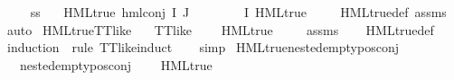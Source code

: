 \begin{isabellebody}
\isanewline
{}\isamarkupfalse%
\ \isanewline
\ \ \ s{\isacharcolon}{\kern0pt}{\isacharcolon}{\kern0pt}{\isacharprime}{\kern0pt}s\isanewline
\ \ \ {\isachardoublequoteopen}HML{\isacharunderscore}{\kern0pt}true\ {\isacharparenleft}{\kern0pt}hml{\isacharunderscore}{\kern0pt}conj\ I\ J\ {\isasymPhi}{\isacharparenright}{\kern0pt}{\isachardoublequoteclose}\isanewline
\ \ \ {\isachardoublequoteopen}{\isasymforall}{\isasymphi}\ {\isasymin}\ {\isasymPhi}\ {\isacharbackquote}{\kern0pt}\ I{\isachardot}{\kern0pt}\ HML{\isacharunderscore}{\kern0pt}true\ {\isasymphi}{\isachardoublequoteclose}\isanewline
%
\isadelimproof
\ \ %
\endisadelimproof
%
\isatagproof
{}\isamarkupfalse%
\ HML{\isacharunderscore}{\kern0pt}true{\isacharunderscore}{\kern0pt}def\ assms\ \isamarkupfalse%
\ auto%
\endisatagproof
{\isafoldproof}%
%
\isadelimproof
\isanewline
%
\endisadelimproof
\isanewline
{}\isamarkupfalse%
\ HML{\isacharunderscore}{\kern0pt}true{\isacharunderscore}{\kern0pt}TT{\isacharunderscore}{\kern0pt}like{\isacharcolon}{\kern0pt}\isanewline
\ \ \ {\isachardoublequoteopen}TT{\isacharunderscore}{\kern0pt}like\ {\isasymphi}{\isachardoublequoteclose}\isanewline
\ \ \ {\isachardoublequoteopen}HML{\isacharunderscore}{\kern0pt}true\ {\isasymphi}{\isachardoublequoteclose}\isanewline
%
\isadelimproof
\ \ %
\endisadelimproof
%
\isatagproof
{}\isamarkupfalse%
\ assms\isanewline
\ \ \isamarkupfalse%
\ HML{\isacharunderscore}{\kern0pt}true{\isacharunderscore}{\kern0pt}def\isanewline
\ \ \isamarkupfalse%
\ {\isacharparenleft}{\kern0pt}induction\ {\isasymphi}\ rule{\isacharcolon}{\kern0pt}\ TT{\isacharunderscore}{\kern0pt}like{\isachardot}{\kern0pt}induct{\isacharparenright}{\kern0pt}\isanewline
\ \ \isamarkupfalse%
\ simp{\isacharplus}{\kern0pt}%
\endisatagproof
{\isafoldproof}%
%
\isadelimproof
\isanewline
%
\endisadelimproof
\isanewline
{}\isamarkupfalse%
\ HML{\isacharunderscore}{\kern0pt}true{\isacharunderscore}{\kern0pt}nested{\isacharunderscore}{\kern0pt}empty{\isacharunderscore}{\kern0pt}pos{\isacharunderscore}{\kern0pt}conj{\isacharcolon}{\kern0pt}\isanewline
\ \ \ {\isachardoublequoteopen}nested{\isacharunderscore}{\kern0pt}empty{\isacharunderscore}{\kern0pt}pos{\isacharunderscore}{\kern0pt}conj\ {\isasymphi}{\isachardoublequoteclose}\isanewline
\ \ \ {\isachardoublequoteopen}HML{\isacharunderscore}{\kern0pt}true\ {\isasymphi}{\isachardoublequoteclose}\isanewline

\end{isabellebody}
